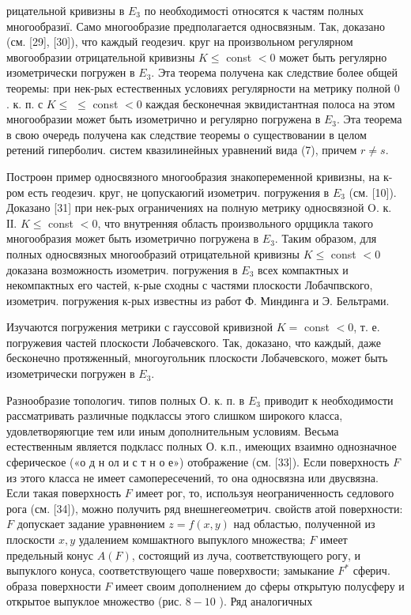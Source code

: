 \documentclass[10pt]{article}
\begin{document}
рицательной кривизны в $E_{3}$ по необходимості относятся к частям полных многообразиї. Само многообразие предполагается односвязным. Так, доказано (см. [29], [30]), что каждый геодезич. круг на произвольном регулярном мвогообразии отрицательной кривизны $K \leqslant$ const $<0$ может быть регулярно изометрически погружен в $E_{3}$. Эта теорема получена как следствие более общей теоремы: при нек-рых естественных условиях регулярности на метрику полной 0 . к. п. с $K \leqslant$ $\leqslant$ const $<0$ каждая бесконечная эквидистантная полоса на этом многообразии может быть изометрично и регулярно погружена в $E_{3}$. Эта теорема в свою очередь получена как следствие теоремы о существовании в целом ретений гиперболич. систем квазилинейных уравнений вида (7), причем $r \neq s$.



Построөн пример односвязного многообразия знакопеременной кривизны, на к-ром есть геодезич. круг, не цопускаюгий изометрич. погружения в $E_{3}$ (см. [10]). Доказано [31] при нек-рых ограничениях на полную метрику односвязной $\mathrm{O}$. к. ІІ. $K \leqslant$ const $<0$, что внутренняя область произвольного орџцикла такого многообразия может быть изометрично погружена в $E_{3}$. Таким образом, для полных односвязных многообразий отрицательной кривизны $K \leqslant$ const $<0$ доказана возможность изометрич. погружения в $E_{3}$ всех компактных и некомпактных его частей, к-рые сходны с частями плоскости Лобачпвского, изометрич. погружения к-рых известны из работ Ф. Миндинга и Э. Бельтрами.



Изучаются погружения метрики с гауссовой кривизной $K=$ const $<0$, т. е. погружевия частей плоскости Лобачевского. Так, доказано, что каждый, даже бесконечно протяженный, многоугольник плоскости Лобачевского, может быть изометрически погружен в $E_{3}$.



Разнообразие топологич. типов полных О. к. п. в $E_{3}$ приводит к необходимости рассматривать различные подклассы этого слишком широкого класса, удовлетворяюгцие тем или иным дополнительным условиям. Весьма естественным является подкласс полных О. к.п., имеющих взаимно однозначное сферическое («о д н ол и с т н о е») отображение (см. [33]). Если поверхность $F$ из этого класса не имеет самопересечений, то она односвязна или двусвязна. Если такая поверхность $F$ имеет рог, то, используя неограниченность седлового рога (см. [34]), можно получить ряд внешнегеометрич. свойств атой поверхности: $F$ допускает задание уравнөнием $z=f(x, y)$ над областью, полученной из плоскости $x, y$ удалением комшактного выпуклого множества; $F$ имеет предельный конус $A(F)$, состоящий из луча, соответствующего рогу, и выпуклого конуса, соответствующего чаше поверхвости; замыкание $F^{*}$ сферич. образа поверхности $F$ имеет своим дополнением до сферы открытую полусферу и открытое выпуклое множество (рис. $8-10$ ). Ряд аналогичных
\end{document}
